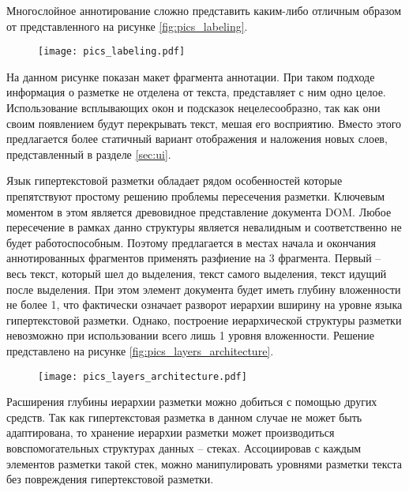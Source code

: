\documentclass[../main]{subfiles}
\begin{document}
Многослойное аннотирование сложно представить каким-либо отличным образом от представленного на рисунке \ref{fig:pics_labeling}. 

\begin{figure}[H]
    \centering
    {\texttt{[image: pics\_labeling.pdf]}}
    \vspace{-\baselineskip}
\end{figure}

На данном рисунке показан макет фрагмента аннотации. При таком подходе информация о разметке не отделена от текста, представляет с ним одно целое. Использование всплывающих окон и подсказок нецелесообразно, так как они своим появлением будут перекрывать текст, мешая его восприятию. Вместо этого предлагается более статичный вариант отображения и наложения новых слоев, представленный в разделе \ref{sec:ui}.

Язык гипертекстовой разметки обладает рядом особенностей которые препятствуют простому решению проблемы пересечения разметки. Ключевым моментом в этом является древовидное представление документа DOM. Любое пересечение в рамках данно структуры является невалидным и соответственно не будет работоспособным. Поэтому предлагается в местах начала и окончания аннотированных фрагментов применять разфиение на 3 фрагмента. Первый -- весь текст, который шел до выделения, текст самого выделения, текст идущий после выделения. При этом элемент документа будет иметь глубину вложенности не более 1, что фактически означает разворот иерархии вширину на уровне языка гипертекстовой разметки. Однако, построение иерархической структуры разметки невозможно при использовании всего лишь 1 уровня вложенности. Решение представлено на рисунке \ref{fig:pics_layers_architecture}.

\begin{figure}[H]
    \centering
    {\texttt{[image: pics\_layers\_architecture.pdf]}}
    \vspace{-\baselineskip}
\end{figure}

Расширения глубины иерархии разметки можно добиться с помощью других средств. Так как гипертекстовая разметка в данном случае не может быть адаптирована, то хранение иерархии разметки может производиться вовспомогательных структурах данных -- стеках. Ассоциировав с каждым элементов разметки такой стек, можно манипулировать уровнями разметки текста без повреждения гипертекстовой разметки. 
\end{document}
